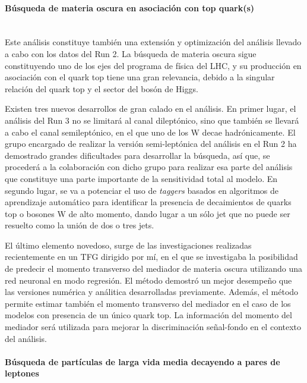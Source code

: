 \paragraph{Búsqueda de materia oscura en asociación con top quark(s)\\\\}

Este análisis constituye también una extensión y optimización del análisis llevado a cabo con los datos del Run 2. La búsqueda de materia oscura sigue constituyendo uno de los ejes del programa de física del LHC, y su producción en asociación con el quark top tiene una gran relevancia, debido a la singular relación del quark top y el sector del bosón de Higgs.

Existen tres nuevos desarrollos de gran calado en el análisis. En primer lugar, el análisis del Run 3 no se limitará al canal dileptónico, sino que también se llevará a cabo el canal semileptónico, en el que uno de los W decae hadrónicamente. El grupo encargado de realizar la versión semi-leptónica del análisis en el Run 2 ha demostrado grandes dificultades para desarrollar la búsqueda, así que, se procederá a la colaboración con dicho grupo para realizar esa parte del análisis que constituye una parte importante de la sensitividad total al modelo. En segundo lugar, se va a potenciar el uso de \emph{taggers} basados en algoritmos de aprendizaje automático para identificar la presencia de decaimientos de quarks top o bosones W de alto momento, dando lugar a un sólo jet que no puede ser resuelto como la unión de dos o tres jets. 

El último elemento novedoso, surge de las investigaciones realizadas recientemente en un TFG dirigido por mí, en el que se investigaba la posibilidad de predecir el momento transverso del mediador de materia oscura utilizando una red neuronal en modo regresión. El método demostró un mejor desempeño que las versiones numérica y análitica desarrolladas previamente. Además, el método permite estimar también el momento transverso del mediador en el caso de los modelos con presencia de un único quark top. La información del momento del mediador será utilizada para mejorar la discriminación señal-fondo en el contexto del análisis. 

\paragraph{Búsqueda de partículas de larga vida media decayendo a pares de leptones\\\\}


